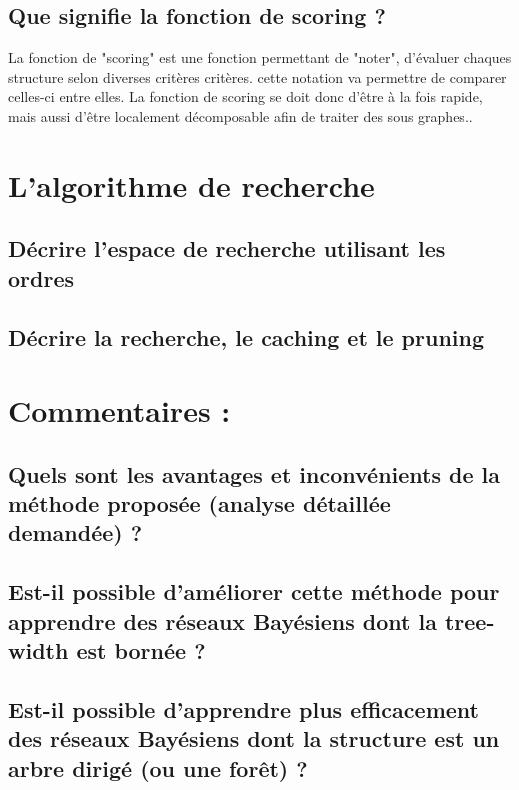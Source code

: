 \documentclass[french,a4paper]{article}
\begin{document}
\subsection{Que signifie la fonction de scoring ?}
La fonction de "scoring" est une fonction permettant de "noter", d'évaluer
 chaques structure selon diverses critères critères. cette notation va permettre
 de comparer celles-ci entre elles.
La fonction de scoring se doit donc d'être à la fois rapide, mais aussi d'être
localement décomposable afin de traiter des sous graphes..

\section{L'algorithme de recherche}
\subsection{Décrire l'espace de recherche utilisant les ordres}


\subsection{Décrire la recherche, le caching et le pruning}


\section{Commentaires :}
\subsection{Quels sont les avantages et inconvénients de la méthode proposée (analyse détaillée demandée) ?}
\subsection{Est-il possible d'améliorer cette méthode pour apprendre des réseaux Bayésiens dont la tree-width est bornée ?}
\subsection{Est-il possible d'apprendre plus efficacement des réseaux Bayésiens dont la structure est un arbre dirigé (ou une forêt) ?}
\end{document}
